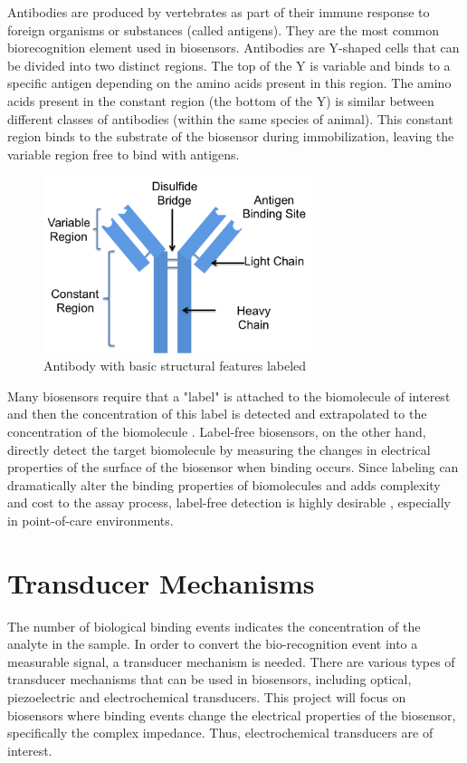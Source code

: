 Antibodies are produced by vertebrates as part of their immune response to foreign organisms or substances (called antigens). They are the most common biorecognition element used in biosensors.\cite{zengRecombinantAntibodiesTheir2012} Antibodies are Y-shaped cells that can be divided into two distinct regions. The top of the Y is variable and binds to a specific antigen depending on the amino acids present in this region. The amino acids present in the constant region (the bottom of the Y) is similar between different classes of antibodies (within the same species of animal).\cite{zengRecombinantAntibodiesTheir2012} This constant region binds to the substrate of the biosensor during immobilization, leaving the variable region free to bind with antigens.\cite{suedaAntibodyImmobilizationImmunosensing2022a}
\begin{figure}[ht]
    \centering
    \includegraphics[width=0.7\textwidth]{antibody.png}
    \caption[Antibody with basic structural features labeled]{Antibody with basic structural features labeled \cite{UsingAntibodiesVaccinea}}
    \label{fig:antibody}
\end{figure}

Many biosensors require that a "label" is attached to the biomolecule of interest and then the concentration of this label is detected and extrapolated to the concentration of the biomolecule \cite{danielsLabelFreeImpedanceBiosensors2007}. Label-free biosensors, on the other hand, directly detect the target biomolecule by measuring the changes in electrical properties of the surface of the biosensor when binding occurs. Since labeling can dramatically alter the binding properties of biomolecules and adds complexity and cost to the assay process, label-free detection is highly desirable \cite{danielsLabelFreeImpedanceBiosensors2007}, especially in point-of-care environments. 

\section{Transducer Mechanisms}
The number of biological binding events indicates the concentration of the analyte in the sample. In order to convert the bio-recognition event into a measurable signal, a transducer mechanism is needed\cite{bhallaIntroductionBiosensors2016}. There are various types of transducer mechanisms that can be used in biosensors, including optical, piezoelectric and electrochemical transducers. This project will focus on biosensors where binding events change the electrical properties of the biosensor, specifically the complex impedance. Thus, electrochemical transducers are of interest. 

